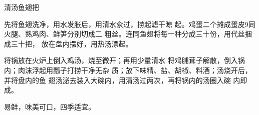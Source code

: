 \begin{recipe}{清汤鱼翅把}

\ingredients



\cooking

先将鱼翅洗净，用水发胀后，用清水汆过，捞起滤干晾 起。鸡蛋二个摊成蛋皮9同火腿、熟鸡肉、鲜笋分别切成二 粗丝。连同鱼翅将每一种分成三十份，用代丝捆成三十把， 放在盘内摆好，用热汤漂起。

\step 将锅放在火炉上倒入鸡汤，烧至微开；再用少量清水 将鸡脯茸子解散，倒入锅内；肉沫浮起用瓢子打捞干净无杂 质；放下味精、盐、胡椒、料酒；汤烧开后，并将盘内的鱼 翅汤泌去装入大碗内，用清汤过两次，再将锅内的汤圈入碗 内即成。

\notes

易鲜，味美可口，四季适宜。

\end{recipe}

